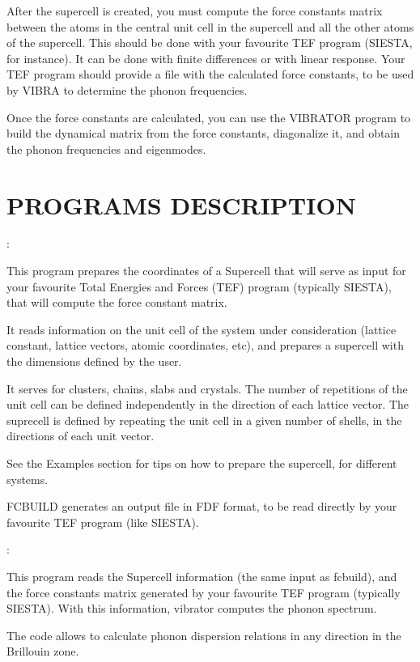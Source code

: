 \noindent
After the supercell is created, you must compute the
force constants matrix between the atoms in the
central unit cell in the supercell and all the other
atoms of the supercell.  This should be done
with your favourite TEF
program (SIESTA, for instance).  It can be
done with finite differences or with linear response.
Your TEF program should provide a file with the
calculated force constants, to be used by VIBRA to determine
the phonon frequencies.

\noindent
Once the force constants are calculated, you can use
the VIBRATOR program to build the dynamical matrix
from the force constants, diagonalize it, and obtain
the phonon frequencies and eigenmodes.

\section{PROGRAMS DESCRIPTION}

\begin{description}
\itemsep 10pt
\parsep 0pt

\item[{\bf FCBUILD}]:

\noindent
This program prepares the coordinates of a Supercell 
that will serve as input for your favourite Total Energies
and Forces (TEF) program (typically SIESTA), that will
compute the force constant matrix.

\noindent
It reads information on the unit cell of the system under
consideration (lattice constant, lattice vectors, atomic
coordinates, etc), and prepares a supercell with the
dimensions defined by the user. 

\noindent
It serves for clusters, chains, slabs and crystals.
The number of repetitions of the unit cell can
be defined independently in the direction of each
lattice vector. The suprecell is defined by
repeating the unit cell in a given number of shells,
in the directions of each unit vector.

\noindent
See the Examples section for tips on how to prepare
the supercell, for different systems.

\noindent
FCBUILD generates an output file in FDF format,
to be read directly by your favourite TEF
program (like SIESTA). 

\item[{\bf VIBRATOR}]:

\noindent
This program reads the Supercell information (the same
input as fcbuild), and the force constants matrix
generated by your favourite TEF
program (typically SIESTA). With this information,
vibrator computes the phonon spectrum.

\noindent
The code allows to calculate phonon dispersion relations
in any direction in the Brillouin zone.

\end{description}



